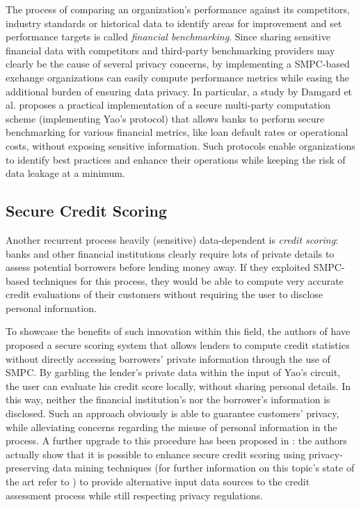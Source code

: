 \documentclass[12pt]{article}
\begin{document}
The process of comparing an organization's performance against its competitors, industry standards or historical data to identify areas for improvement and set performance targets is called \textit{financial benchmarking}. Since sharing sensitive financial data with competitors and third-party benchmarking providers may clearly be the cause of several privacy concerns, by implementing a SMPC-based exchange organizations can easily compute performance metrics while easing the additional burden of ensuring data privacy.
In particular, a study by Damgard et al. \cite{Benchmarking} proposes a practical implementation of a secure multi-party computation scheme (implementing Yao's protocol) that allows banks to perform secure benchmarking for various financial metrics, like loan default rates or operational costs, without exposing sensitive information. Such protocols enable organizations to identify best practices and enhance their operations while keeping the risk of data leakage at a minimum.

\subsection{Secure Credit Scoring}

Another recurrent process heavily (sensitive) data-dependent is \textit{credit scoring}: banks and other financial institutions clearly require lots of private details to assess potential borrowers before lending money away. If they exploited SMPC-based techniques for this process, they would be able to compute very accurate credit evaluations of their customers without requiring the user to disclose personal information.

To showcase the benefits of such innovation within this field, the authors of \cite{Scoring} have proposed a secure scoring system that allows lenders to compute credit statistics without directly accessing borrowers' private information through the use of SMPC. By garbling the lender's private data within the input of Yao's circuit, the user can evaluate his credit score locally, without sharing personal details. In this way, neither the financial institution's nor the borrower's information is disclosed. Such an approach obviously is able to guarantee customers' privacy, while alleviating concerns regarding the misuse of personal information in the process. A further upgrade to this procedure has been proposed in \cite{ScoringMining}: the authors actually show that it is possible to enhance secure credit scoring using privacy-preserving data mining techniques (for further information on this topic's state of the art refer to \cite{Mining}) to provide alternative input data sources to the credit assessment process while still respecting privacy regulations.
\end{document}
